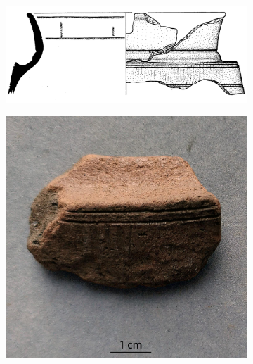 \documentclass[preprint,10pt,oneside,onecolumn,authoryear]{elsarticle}
\begin{document}
\begin{figure}[!p]
	\begin{subfigure}[t]{.49\textwidth}
		\includegraphics[width=\textwidth]{Fig_microCT_Wotzka95_Tafel_69-5.jpg}
		\caption{}
		\label{fig:waf83/16-3:33_drawing}
	\end{subfigure}\hspace{.5em}\hfill
	\begin{subfigure}[t]{.235\textwidth}
		\includegraphics[width=\textwidth]{Fig_microCT_IMG_20220809_084117.jpg}
		\caption{}
		\label{fig:waf83/16-3:33_photo}
	\end{subfigure}\hspace{.5em}\hfill
	\begin{subfigure}[t]{.235\textwidth}

\end{subfigure}
\end{figure}
\end{document}
